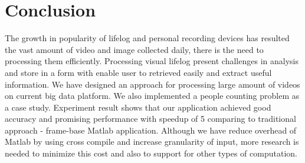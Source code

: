 \section{Conclusion}
\label{sec:sec_conclusion}
The growth in popularity of lifelog and personal recording devices has resulted
the vast amount of video and image collected daily, there is the need to
processing them efficiently. Processing visual lifelog present challenges in
analysis and store in a form with enable user to retrieved easily and extract
useful information. We have designed an approach for processing large amount of
videos on current big data platform. We also implemented a people counting
problem as a case study. Experiment result shows that our application
achieved good accuracy and promising performance with speedup of 5 comparing to
traditional approach - frame-base Matlab application. Although we have reduce
overhead of Matlab by using cross compile and increase granularity of input,
more research is needed to minimize this cost and also to support for other types of computation.
